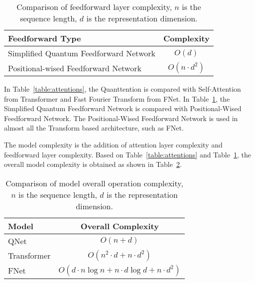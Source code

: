 \begin{table}[htb!]
    \centering
    \begin{tabular}{ l|c  }
        \hline
        Feedforward Type & Complexity\\
        \hline
        Simplified Quantum Feedforward Network & $O(d)$ \\
        Positional-wised Feedforward Network &  $O(n \cdot d^2)$ \\
        \hline
    \end{tabular}
    \caption{Comparison of feedforward layer complexity, $n$ is the sequence length, $d$ is the representation dimension.}
    \label{table:feedforward}
\end{table}


In Table~\ref{table:attentions}, the Quanttention is compared with Self-Attention from Transformer and Fast Fourier Transform from FNet. In Table~\ref{table:feedforward}, the Simplified Quantum Feedforward Network is compared with Positional-Wised Feedforward Network. The Positional-Wised Feedforward Network is used in almost all the Transform based architecture, such as FNet. 

The model complexity is the addition of attention layer complexity and feedforward layer complexity. Based on Table~\ref{table:attentions} and Table~\ref{table:feedforward}, the overall model complexity is obtained as shown in Table~\ref{table:overval}.

\begin{table}[htb!]
    \centering
    \begin{tabular}{ l|c  }
        \hline
        Model & Overall Complexity \\
        \hline
        QNet & $O(n + d)$ \\
        Transformer &  $O(n^2 \cdot d + n \cdot d^2)$ \\
        FNet &  $O(d \cdot  n \log n + n \cdot d \log d + n \cdot d^2)$ \\
        \hline
    \end{tabular}
    \caption{Comparison of model overall operation complexity, $n$ is the sequence length, $d$ is the representation dimension.}
    \label{table:overval}
\end{table}
